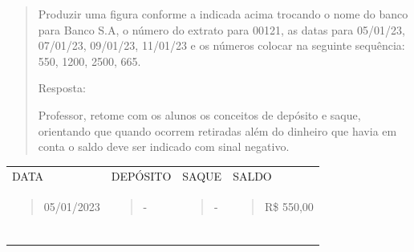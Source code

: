 {{\begin{quote}
Produzir uma figura conforme a indicada acima trocando o nome do banco
para Banco S.A, o número do extrato para 00121, as datas para 05/01/23,
07/01/23, 09/01/23, 11/01/23 e os números colocar na seguinte sequência:
550, 1200, 2500, 665.

Resposta:

Professor, retome com os alunos os conceitos de depósito e saque,
orientando que quando ocorrem retiradas além do dinheiro que havia em
conta o saldo deve ser indicado com sinal negativo.
\end{quote}

\begin{longtable}[]{@{}llll@{}}
\toprule
\endhead
\begin{minipage}[t]{0.18\columnwidth}\raggedright
DATA\strut
\end{minipage} & \begin{minipage}[t]{0.20\columnwidth}\raggedright
DEPÓSITO\strut
\end{minipage} & \begin{minipage}[t]{0.20\columnwidth}\raggedright
SAQUE\strut
\end{minipage} & \begin{minipage}[t]{0.20\columnwidth}\raggedright
SALDO\strut
\end{minipage}\tabularnewline
\begin{minipage}[t]{0.18\columnwidth}\raggedright
\begin{quote}
05/01/2023
\end{quote}\strut
\end{minipage} & \begin{minipage}[t]{0.20\columnwidth}\raggedright
\begin{quote}
-
\end{quote}\strut
\end{minipage} & \begin{minipage}[t]{0.20\columnwidth}\raggedright
\begin{quote}
-
\end{quote}\strut
\end{minipage} & \begin{minipage}[t]{0.20\columnwidth}\raggedright
\begin{quote}
R\$ 550,00
\end{quote}\strut
\end{minipage}\tabularnewline
\begin{minipage}[t]{0.18\columnwidth}\raggedright
\begin{quote}

\end{quote}
\end{minipage}
\end{longtable}}}
